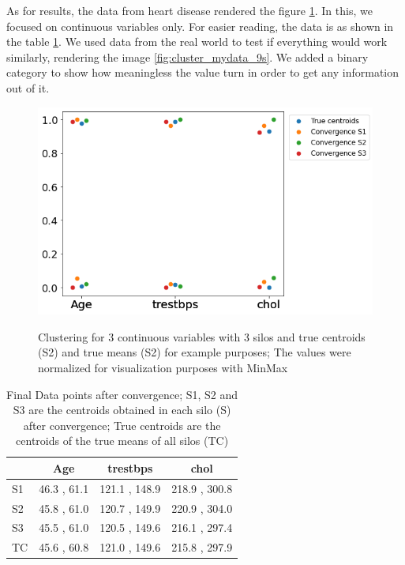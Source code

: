 As for results, the data from heart disease rendered the figure \ref{fig:cluster_free_3s}. In this, we focused on continuous variables only. For easier reading, the data is as shown in the table \ref{tab:datapoints}. We used data from the real world to test if everything would work similarly, rendering the image \ref{fig:cluster_mydata_9s}. We added a binary category to show how meaningless the value turn in order to get any information out of it.





\begin{figure}[htpb]
\centering
\captionsetup{justification=centering}
\caption[Clustering for 3 continuous variables with 3 silos]{Clustering for 3 continuous variables with 3 silos and true centroids (S2) and true means (S2) for example purposes; The values were normalized for visualization purposes with MinMax}
\includegraphics[scale=0.50]{figures/my_cluster_3.png}
\label{fig:cluster_free_3s} 
\end{figure}



\begin{table}[htbp]
\centering
 \setlength{\tabcolsep}{7pt} %
 \renewcommand{\arraystretch}{1.35} %
  \captionsetup{justification=centering} 
\caption[Final Data points after convergence of clustering]{Final Data points after convergence; S1, S2 and S3 are the centroids obtained in each silo (S) after convergence; True centroids are the centroids of the true means of all silos (TC)}
\label{tab:datapoints}
\begin{tabular}{lccc}
\toprule
 & Age & trestbps & chol \\
\midrule
S1 & 46.3 , 61.1 & 121.1 , 148.9 & 218.9 , 300.8 \\
S2  & 45.8 , 61.0 & 120.7 , 149.9 & 220.9 , 304.0 \\
S3 & 45.5 , 61.0 & 120.5 , 149.6 & 216.1 , 297.4 \\
TC  & 45.6 , 60.8 & 121.0 , 149.6 & 215.8 , 297.9   \\

\bottomrule
\end{tabular}
\end{table}





